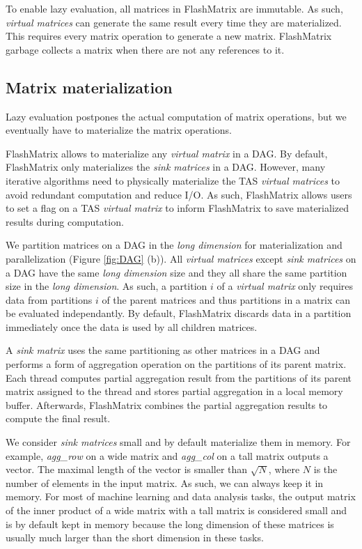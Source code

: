 To enable lazy evaluation, all matrices in FlashMatrix are immutable.
As such, \textit{virtual matrices} can generate the same result every time
they are materialized. This requires every matrix operation to generate
a new matrix. FlashMatrix garbage collects a matrix when there are not any
references to it.

\subsection{Matrix materialization} \label{sec:materialize}
Lazy evaluation postpones the actual computation of matrix operations, but we
eventually have to materialize the matrix operations.

FlashMatrix allows to materialize any \textit{virtual matrix} in a DAG.
By default, FlashMatrix only materializes the \textit{sink matrices} in a DAG.
However, many iterative algorithms need to physically materialize the TAS
\textit{virtual matrices} to avoid redundant computation and reduce I/O. As such,
FlashMatrix allows users to set a flag on a TAS \textit{virtual matrix} to
inform FlashMatrix to save materialized results during computation.

We partition matrices on a DAG in the \textit{long dimension} for materialization
and parallelization (Figure \ref{fig:DAG} (b)). All \textit{virtual matrices}
except \textit{sink matrices} on a DAG have the same \textit{long dimension}
size and they all share the same partition size in the \textit{long dimension}.
As such, a partition $i$ of a \textit{virtual matrix} only requires data from
partitions $i$ of the parent matrices and thus partitions in a matrix can be
evaluated independantly. By default, FlashMatrix discards data in a partition
immediately once the data is used by all children matrices.

A \textit{sink matrix} uses the same partitioning as other matrices in a DAG
and performs a form of aggregation operation on the partitions
of its parent matrix. Each thread computes partial aggregation result from
the partitions of its parent matrix assigned to the thread and stores partial
aggregation in a local memory buffer. Afterwards, FlashMatrix combines
the partial aggregation results to compute the final result.

We consider \textit{sink matrices} small and by default materialize them
in memory. For example, \textit{agg\_row} on a wide matrix and
\textit{agg\_col} on a tall matrix outputs a vector. The maximal length of
the vector is smaller than $\sqrt{N}$, where $N$ is the number of elements
in the input matrix. As such, we can always keep it in memory. For most of machine
learning and data analysis tasks, the output matrix of the inner product of
a wide matrix with a tall matrix is considered small and is by default kept
in memory because the long dimension of these matrices is usually much larger
than the short dimension in these tasks.

